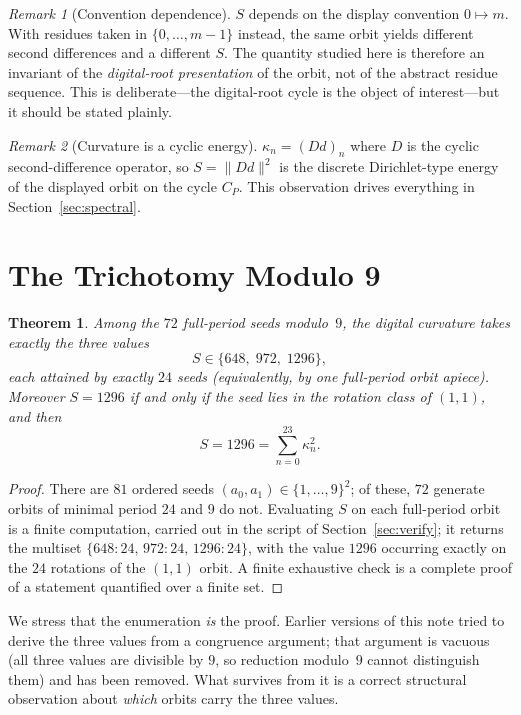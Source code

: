 \documentclass[12pt]{article}
\newtheorem{thm}{Theorem}
\theoremstyle{remark}
\newtheorem{rem}{Remark}
\begin{document}
\begin{rem}[Convention dependence]
$S$ depends on the display convention $0\mapsto m$. With residues taken in
$\{0,\dots,m-1\}$ instead, the same orbit yields different second differences and a
different $S$. The quantity studied here is therefore an invariant of the
\emph{digital-root presentation} of the orbit, not of the abstract residue sequence. This
is deliberate---the digital-root cycle is the object of interest---but it should be stated
plainly.
\end{rem}

\begin{rem}[Curvature is a cyclic energy]
$\kappa_n=(D d)_n$ where $D$ is the cyclic second-difference operator, so
$S=\lVert Dd\rVert^2$ is the discrete Dirichlet-type energy of the displayed orbit on the
cycle $C_P$. This observation drives everything in Section~\ref{sec:spectral}.
\end{rem}

\section{The Trichotomy Modulo 9}\label{sec:trichotomy}

\begin{thm}\label{thm:trichotomy}
Among the $72$ full-period seeds modulo~$9$, the digital curvature takes exactly the three
values
\[
S\in\{648,\;972,\;1296\},
\]
each attained by exactly $24$ seeds (equivalently, by one full-period orbit apiece).
Moreover $S=1296$ if and only if the seed lies in the rotation class of $(1,1)$, and then
\[
S=1296=\sum_{n=0}^{23}\kappa_n^2 .
\]
\end{thm}

\begin{proof}
There are $81$ ordered seeds $(a_0,a_1)\in\{1,\dots,9\}^2$; of these, $72$ generate orbits
of minimal period $24$ and $9$ do not. Evaluating $S$ on each full-period orbit is a
finite computation, carried out in the script of Section~\ref{sec:verify}; it returns the
multiset $\{648{:}24,\,972{:}24,\,1296{:}24\}$, with the value $1296$ occurring exactly on
the $24$ rotations of the $(1,1)$ orbit. A finite exhaustive check is a complete proof of a
statement quantified over a finite set.
\end{proof}

We stress that the enumeration \emph{is} the proof. Earlier versions of this note tried to
derive the three values from a congruence argument; that argument is vacuous (all three
values are divisible by $9$, so reduction modulo~$9$ cannot distinguish them) and has been
removed. What survives from it is a correct structural observation about \emph{which}
orbits carry the three values.
\end{document}
